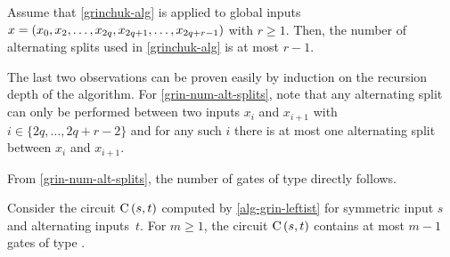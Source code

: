 \begin{observation} \label{grin-num-alt-splits}
 Assume that \cref{grinchuk-alg} is applied to global inputs 
 $x = ({x_0, x_2, \dotsc, x_{2q}, x_{2q+1}, \dotsc, x_{2q + r - 1}})$ with $r \geq 1$.
 Then, the number of alternating splits used in \cref{grinchuk-alg} is at most $r-1$. 
\end{observation}

The last two observations can be proven easily by induction on the 
recursion depth of the algorithm. For \cref{grin-num-alt-splits}, note that any 
alternating split can only be performed between two inputs $x_i$ and $x_{i+1}$ with 
$i \in \{2q,\dots, 2q + r - 2\}$ and for any such $i$ there is at most one alternating
split between $x_i$ and $x_{i+1}$.

From \cref{grin-num-alt-splits}, the number of gates of type 
directly follows.

\begin{qedcorollary} \label{cor-alt-split-gates}
 Consider the circuit $\operatorname{C}\left({s, t}\right)$ computed by \cref{alg-grin-leftist} for
 symmetric input $s$ and alternating inputs~$t$.
 For $m \geq 1$, the circuit $\operatorname{C}\left({s, t}\right)$ contains at most $m - 1$ gates of type .
\end{qedcorollary}


